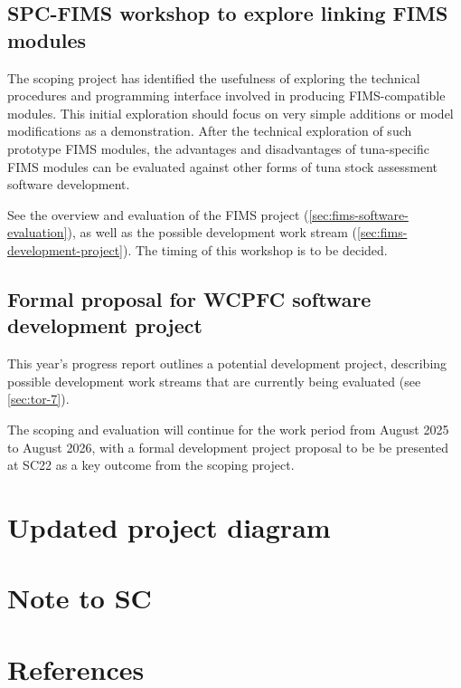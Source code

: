 \documentclass{SCreport}
\begin{document}
\vspace{2ex}

\subsection{SPC-FIMS workshop to explore linking FIMS modules}
\label{sec:fims-workshop}

The scoping project has identified the usefulness of exploring the technical
procedures and programming interface involved in producing FIMS-compatible
modules. This initial exploration should focus on very simple additions or model
modifications as a demonstration. After the technical exploration of such
prototype FIMS modules, the advantages and disadvantages of tuna-specific FIMS
modules can be evaluated against other forms of tuna stock assessment software
development.

See the overview and evaluation of the FIMS project
(\autoref{sec:fims-software-evaluation}), as well as the possible development
work stream (\autoref{sec:fims-development-project}). The timing of this
workshop is to be decided.

\vspace{2ex}

\subsection{Formal proposal for WCPFC software development project}
\label{sec:development-proposal-sc22}

This year's progress report outlines a potential development project, describing
possible development work streams that are currently being evaluated (see
\autoref{sec:tor-7}).

The scoping and evaluation will continue for the work period from August 2025 to
August 2026, with a formal development project proposal to be be presented at
SC22 as a key outcome from the scoping project.

\section{Updated project diagram}

\section{Note to SC}

\section{References}
\end{document}
